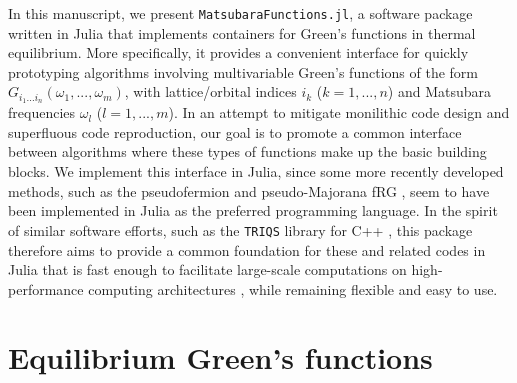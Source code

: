 \documentclass{SciPost}
\begin{document}
In this manuscript, we present \texttt{MatsubaraFunctions.jl}, a software package written in Julia \cite{bezanson2017julia} that implements containers for Green's functions in thermal equilibrium. More specifically, it provides a convenient interface for quickly prototyping algorithms involving multivariable Green's functions of the form $G_{i_1 ... i_n}(\omega_1, ..., \omega_m)$, with lattice/orbital indices $i_k$ ($k = 1, ..., n$) and Matsubara frequencies $\omega_l$ ($l = 1, ..., m$). In an attempt to mitigate monilithic code design and superfluous code reproduction, our goal is to promote a common interface between algorithms where these types of functions make up the basic building blocks. We implement this interface in Julia, since some more recently developed methods, such as the pseudofermion  \cite{PhysRevB.81.144410, PhysRevB.83.024402, PhysRevB.84.014417, PhysRevB.84.100406, thoenniss2020multiloop, PhysRevResearch.4.023185, ritter_benchmark_2022, PhysRevResearch.5.L012025} and pseudo-Majorana fRG \cite{PhysRevB.103.104431, 10.21468/SciPostPhys.12.5.156, sbierski2023magnetism, PhysRevLett.130.196601}, seem to have been implemented in Julia as the preferred programming language. In the spirit of similar software efforts, such as the \texttt{TRIQS} library for C++ \cite{Parcollet_2015}, this package therefore aims to provide a common foundation for these and related codes in Julia that is fast enough to facilitate large-scale computations on high-performance computing architectures \cite{Rohe_2016}, while remaining flexible and easy to use. 

\section{Equilibrium Green's functions}
\label{sec:gf}
\end{document}
